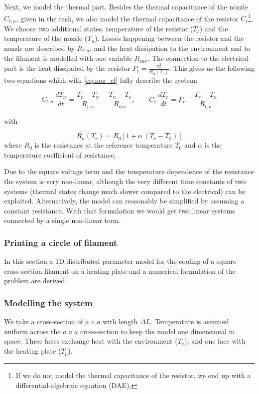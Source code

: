 Next, we model the thermal part. Besides the thermal capacitance of the nozzle $C_{t,n}$, given in the task, we also model the thermal capacitance of the resistor $C_r$\footnote{If we do not model the thermal capacitance of the resistor, we end up with a differential-algebraic equation (DAE).}. We choose two additional states, temperature of the resistor ($T_r$) and the temperature of the nozzle ($T_n$). Losses happening between the resistor and the nozzle are described by $R_{t,n}$, and the heat dissipation to the environment and to the filament is modelled with one variable $R_{\mathrm{env}}$. The connection to the electrical part is the heat dissipated by the resistor $P_r = \frac{u_c^2}{R_n(T_r)}$. This gives us the following two equations which with \eqref{eq:noz_el} fully describe the system:

\begin{equation}
  \label{eq:noz_th}
    C_{t,n}\,\frac{dT_n}{dt} = \frac{T_r - T_n}{R_{t,n}} - \frac{T_n - T_e}{R_{\mathrm{env}}}, \qquad
    C_r\,\frac{dT_r}{dt} = P_r - \frac{T_r - T_n}{R_{t,n}}
\end{equation}

with

\begin{equation}
  R_n(T_r) = R_0\left[1 + \alpha\,(T_r - T_0)\right]
\end{equation}
where $R_0$ is the resistance at the reference temperature $T_0$ and $\alpha$ is the temperature coefficient of resistance.

Due to the square voltage term and the temperature dependence of the resistance the system is very non-linear, although the very different time constants of two systems (thermal states change much slower compared to the electrical) can be exploited. Alternatively, the model can reasonably be simplified by assuming a constant resistance. With that formulation we would get two linear systems connected by a single non-linear term.

\subsubsection{Printing a circle of filament}

In this section a 1D distributed parameter model for the cooling of a square cross-section filament on a heating plate and a numerical formulation of the problem are derived.

\subsubsection*{Modelling the system}
We take a cross-section of $a \times a$ with length $\Delta L$. Temperature is assumed uniform across the $a \times a$ cross-section to keep the model one dimensional in space. Three faces exchange heat with the environment ($T_e$), and one face with the heating plate ($T_p$).

